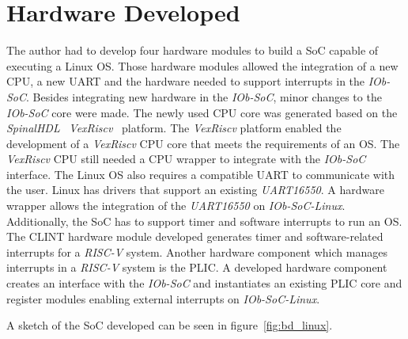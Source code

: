 
\section{Hardware Developed}
\label{sec:hardware_developed}

The author had to develop four hardware modules to build a SoC capable of executing a Linux OS. Those hardware modules allowed the integration of a new CPU, a new UART and the hardware needed to support interrupts in the \textit{IOb-SoC}. Besides integrating new hardware in the \textit{IOb-SoC}, minor changes to the \textit{IOb-SoC} core were made. The newly used CPU core was generated based on the \textit{SpinalHDL}~\cite{papon2017spinalhdl} \textit{VexRiscv}~\cite{vexriscv} platform. The \textit{VexRiscv} platform enabled the development of a \textit{VexRiscv} CPU core that meets the requirements of an OS. The \textit{VexRiscv} CPU still needed a CPU wrapper to integrate with the \textit{IOb-SoC} interface. The Linux OS also requires a compatible UART to communicate with the user. Linux has drivers that support an existing \textit{UART16550}. A hardware wrapper allows the integration of the \textit{UART16550} on \textit{IOb-SoC-Linux}. Additionally, the SoC has to support timer and software interrupts to run an OS. The CLINT hardware module developed generates timer and software-related interrupts for a \textit{RISC-V} system. Another hardware component which manages interrupts in a \textit{RISC-V} system is the PLIC. A developed hardware component creates an interface with the \textit{IOb-SoC} and instantiates an existing PLIC core and register modules enabling external interrupts on \textit{IOb-SoC-Linux}. 

A sketch of the SoC developed can be seen in figure~\ref{fig:bd_linux}.

